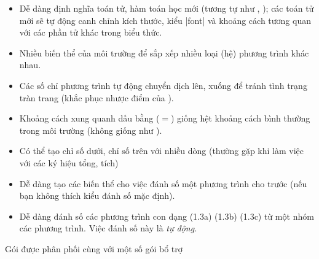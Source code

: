 \medskip
\begin{itemize}
\item
Dễ dàng định nghĩa toán tử, hàm toán học mới (tương tự như , );
các toán tử mới sẽ tự động canh chỉnh kích thước, kiểu |font|
và khoảng cách tương quan với các phần tử khác trong biểu thức.

\item
Nhiều biến thể của môi trường 
để sắp xếp nhiều loại (hệ) phương trình khác nhau.

\item
Các số chỉ phương trình tự động chuyển dịch lên, xuống để tránh
tình trạng tràn trang (khắc phục nhược điểm của ).

\item
Khoảng cách xung quanh dấu bằng ($=$) giống hệt khoảng cách bình thường
trong môi trường  (không giống như ).

\item
Có thể tạo chỉ số dưới, chỉ số trên với nhiều dòng (thường gặp khi 
làm việc với các ký hiệu tổng, tích)

\item
Dễ dàng tạo các biến thể cho việc đánh số một phương trình cho trước
(nếu bạn không thích kiểu đánh số mặc định).

\item
Dễ dàng đánh số các phương trình con dạng (1.3a) (1.3b) (1.3c)
từ một nhóm các phương trình. Việc đánh số này là \emph{tự động.}
\end{itemize}

\medskip
Gói  được phân phối cùng với một số gói bổ trợ

